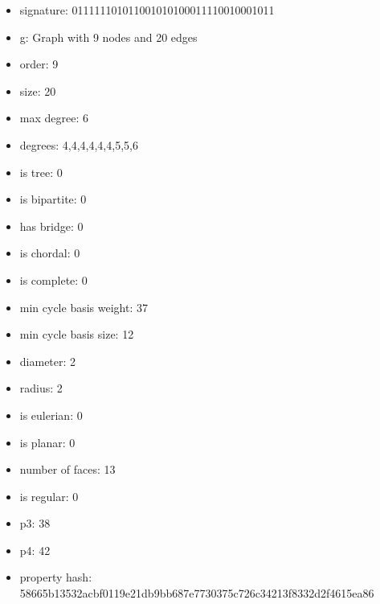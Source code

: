 \newpage
\begin{figure}
\end{figure}
\begin{itemize}
\item signature: 011111101011001010100011110010001011
\item g: Graph with 9 nodes and 20 edges
\item order: 9
\item size: 20
\item max degree: 6
\item degrees: 4,4,4,4,4,4,5,5,6
\item is tree: 0
\item is bipartite: 0
\item has bridge: 0
\item is chordal: 0
\item is complete: 0
\item min cycle basis weight: 37
\item min cycle basis size: 12
\item diameter: 2
\item radius: 2
\item is eulerian: 0
\item is planar: 0
\item number of faces: 13
\item is regular: 0
\item p3: 38
\item p4: 42
\item property hash: 58665b13532acbf0119e21db9bb687e7730375c726c34213f8332d2f4615ea86
\end{itemize}
